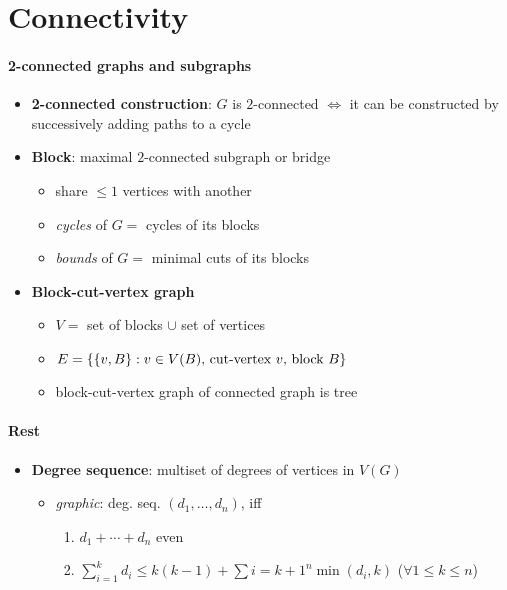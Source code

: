 \section{Connectivity}

\paragraph{2-connected graphs and subgraphs}
\begin{itemize}
  \item \textbf{2-connected construction}: $ G $ is $ 2 $-connected $ \Leftrightarrow $ it can be constructed by successively adding paths to a cycle
  \item \textbf{Block}: maximal $ 2 $-connected subgraph or bridge
  \begin{itemize}
    \item share $ \leq 1 $ vertices with another
    \item \emph{cycles} of $ G = $ cycles of its blocks
    \item \emph{bounds} of $ G = $ minimal cuts of its blocks
  \end{itemize} 
  \item \textbf{Block-cut-vertex graph}
  \begin{itemize}
    \item $ V = $ set of blocks $ \cup $ set of vertices
    \item $ E = \{ \{ v,B \} : v \in V(B) \text{, cut-vertex $ v $, block $ B $} \} $ 
    \item block-cut-vertex graph of connected graph is tree
  \end{itemize}
\end{itemize}

\paragraph{Rest}
\begin{itemize}
  \item \textbf{Degree sequence}: multiset of degrees of vertices in $ V(G) $
  \begin{itemize}
    \item \emph{graphic}: deg. seq. $ (d_1, \dots, d_n) $, iff
    \begin{enumerate}
       \item $ d_1 + \cdots + d_n $ even
       \item $ \sum_{i=1}^k d_i \leq k(k-1) + \sum{i = k+1}^n \min(d_i,k) $ \quad ($ \forall 1 \leq k \leq n $)
     \end{enumerate} 
  \end{itemize}
\end{itemize}

